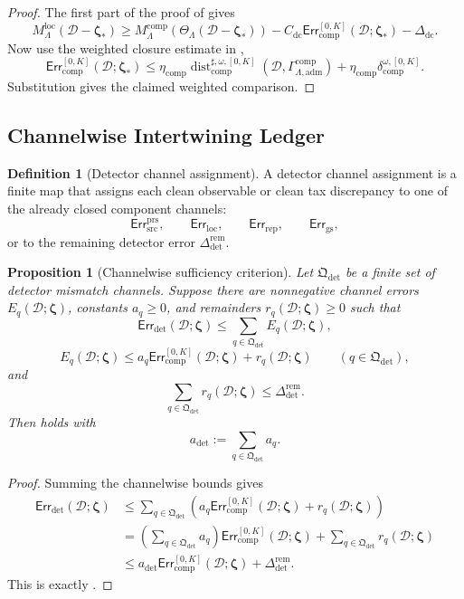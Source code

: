 \documentclass[11pt]{article}
\numberwithin{equation}{section}
\newtheorem{proposition}[proposition]{Proposition}
\theoremstyle{definition}
\newtheorem{definition}[definition]{Definition}
\theoremstyle{remark}
\newcommand{\loc}{\mathrm{loc}}
\newcommand{\adm}{\mathrm{adm}}
\newcommand{\src}{\mathrm{src}}
\newcommand{\comp}{\mathrm{comp}}
\newcommand{\detc}{\mathrm{det}}
\newcommand{\Err}{\mathsf{Err}}
\newcommand{\Dist}{\operatorname{dist}}
\newcommand{\calD}{\mathcal D}
\newcommand{\bzeta}{\boldsymbol\zeta}
\newcommand{\Gcomp}{\Gamma_{\Lambda,\adm}^{\comp}}
\begin{document}
\begin{proof}
The first part of the proof of  gives
\[
    M_{\Lambda}^{\loc}(\calD-\bzeta_*)
    \ge
    M_{\Lambda}^{\comp}(\Theta_{\Lambda}(\calD-\bzeta_*))
    -
    C_{\mathrm{dc}}
    \Err_{\comp}^{[0,K]}(\calD;\bzeta_*)
    -
    \Delta_{\mathrm{dc}}.
\]
Now use the weighted closure estimate in ,
\[
    \Err_{\comp}^{[0,K]}(\calD;\bzeta_*)
    \le
    \eta_{\comp}
    \Dist_{\comp}^{\sharp,\omega,[0,K]}(\calD,\Gcomp)
    +
    \eta_{\comp}
    \delta_{\comp}^{\omega,[0,K]}.
\]
Substitution gives the claimed weighted comparison.
\end{proof}

\subsection{Channelwise Intertwining Ledger}
\label{sec:channel-ledger}

\begin{definition}[Detector channel assignment]
\label{def:channel-assignment}
A detector channel assignment is a finite map that assigns each clean observable
or clean tax discrepancy to one of the already closed component channels:
\[
    \Err_{\src}^{\mathrm{prs}},
    \qquad
    \Err_{\loc},
    \qquad
    \Err_{\mathrm{rep}},
    \qquad
    \Err_{\mathrm{gs}},
\]
or to the remaining detector error \(\Delta_{\detc}^{\mathrm{rem}}\).
\end{definition}

\begin{proposition}[Channelwise sufficiency criterion]
\label{prop:channelwise-sufficiency}
Let \(\mathfrak Q_{\detc}\) be a finite set of detector mismatch channels.
Suppose there are nonnegative channel errors \(E_q(\calD;\bzeta)\), constants
\(a_q\ge0\), and remainders \(r_q(\calD;\bzeta)\ge0\) such that
\[
    \Err_{\detc}(\calD;\bzeta)
    \le
    \sum_{q\in\mathfrak Q_{\detc}}E_q(\calD;\bzeta),
\]
\[
    E_q(\calD;\bzeta)
    \le
    a_q\Err_{\comp}^{[0,K]}(\calD;\bzeta)
    +
    r_q(\calD;\bzeta)
    \qquad(q\in\mathfrak Q_{\detc}),
\]
and
\[
    \sum_{q\in\mathfrak Q_{\detc}}r_q(\calD;\bzeta)
    \le
    \Delta_{\detc}^{\mathrm{rem}}.
\]
Then  holds with
\[
    a_{\detc}:=\sum_{q\in\mathfrak Q_{\detc}}a_q.
\]
\end{proposition}

\begin{proof}
Summing the channelwise bounds gives
\[
\begin{aligned}
    \Err_{\detc}(\calD;\bzeta)
    &\le
    \sum_{q\in\mathfrak Q_{\detc}}
    \left(
        a_q\Err_{\comp}^{[0,K]}(\calD;\bzeta)
        +
        r_q(\calD;\bzeta)
    \right)\\
    &=
    \left(\sum_{q\in\mathfrak Q_{\detc}}a_q\right)
    \Err_{\comp}^{[0,K]}(\calD;\bzeta)
    +
    \sum_{q\in\mathfrak Q_{\detc}}r_q(\calD;\bzeta)\\
    &\le
    a_{\detc}\Err_{\comp}^{[0,K]}(\calD;\bzeta)
    +
    \Delta_{\detc}^{\mathrm{rem}}.
\end{aligned}
\]
This is exactly .
\end{proof}
\end{document}
